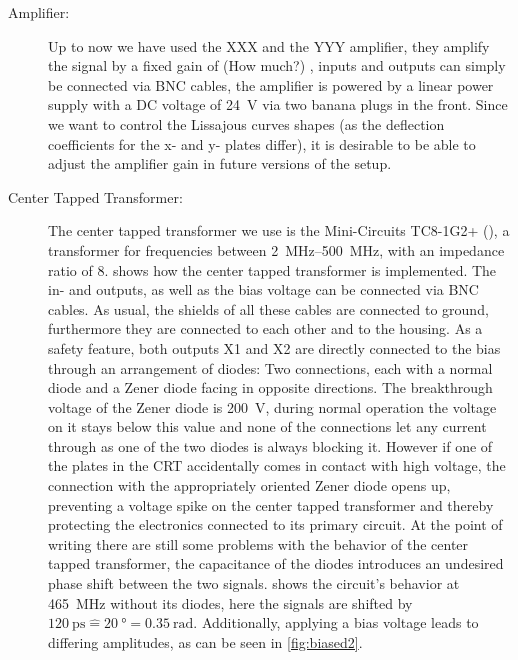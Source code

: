 \begin{description}
	\item[Amplifier:] Up to now we have used the XXX  and the YYY  amplifier, they amplify the signal by a fixed gain of (How much?) , inputs and outputs can simply be connected via BNC cables, the amplifier is powered by a linear power supply with a DC voltage of \SI{24}{\volt} via two banana plugs in the front. Since we want to control the Lissajous curves shapes (as the deflection coefficients for the x- and y- plates differ), it is desirable to be able to adjust the amplifier gain in future versions of the setup. 
	
	\item[Center Tapped Transformer:] The center tapped transformer we use is the Mini-Circuits TC8-1G2+ (\cite{TC8-1G2}), a transformer for frequencies between \SIrange{2}{500}{\mega\hertz}, with an impedance ratio of 8.  shows how the center tapped transformer is implemented. The in- and outputs, as well as the bias voltage can be connected via BNC cables. As usual, the shields of all these cables are connected to ground, furthermore they are connected to each other and to the housing. As a safety feature, both outputs X1 and X2 are directly connected to the bias through an arrangement of diodes: Two connections, each with a normal diode and a Zener diode facing in opposite directions. The breakthrough voltage of the Zener diode is \SI{200}{\volt}, during normal operation the voltage on it stays below this value and none of the connections let any current through as one of the two diodes is always blocking it. However if one of the plates in the CRT accidentally comes in contact with high voltage, the connection with the appropriately oriented Zener diode opens up, preventing a voltage spike on the center tapped transformer and thereby protecting the electronics connected to its primary circuit.
	At the point of writing there are still some problems with the behavior of the center tapped transformer, the capacitance of the diodes introduces an undesired phase shift between the two signals.  shows the circuit's behavior at \SI{465}{\mega\hertz} without its diodes, here the signals are shifted by $\SI{120}{\pico\second} \mathrel{\widehat{=}} \SI{20}{\degree} = \SI{0.35}{\radian}$. Additionally, applying a bias voltage leads to differing amplitudes, as can be seen in \cref{fig:biased2}.
	

\end{description}

